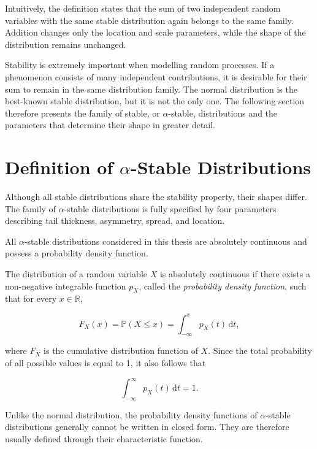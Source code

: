 \documentclass[a4paper, 12pt, openany]{book}
\begin{document}
\begin{tcolorbox}[colback=yellow!5!white, colframe=orange!70!black, title=\textbf{Intuition}, fonttitle=\bfseries]

Intuitively, the definition states that the sum of two independent random variables with the same stable distribution again belongs to the same family. Addition changes only the location and scale parameters, while the shape of the distribution remains unchanged.
\end{tcolorbox}

Stability is extremely important when modelling random processes. If a phenomenon consists of many independent contributions, it is desirable for their sum to remain in the same distribution family. The normal distribution is the best-known stable distribution, but it is not the only one. The following section therefore presents the family of stable, or $\alpha$-stable, distributions and the parameters that determine their shape in greater detail.

\section{Definition of $\alpha$-Stable Distributions}
Although all stable distributions share the stability property, their shapes differ. The family of $\alpha$-stable distributions is fully specified by four parameters describing tail thickness, asymmetry, spread, and location.

All $\alpha$-stable distributions considered in this thesis are absolutely continuous and possess a probability density function.

\begin{tcolorbox}[colback=blue!5!white,colframe=blue!50!black,title=Definition 2: Absolutely continuous distribution]
\label{def:zvezna}
The distribution of a random variable $X$ is absolutely continuous if there exists a non-negative integrable function $p_X$, called the \emph{probability density function}, such that for every $x\in\mathbb{R}$,

\[
F_X(x)=\mathbb{P}(X\leq x)
=\int_{-\infty}^{x}p_X(t)\,\mathrm{d}t,
\]

where $F_X$ is the cumulative distribution function of $X$. Since the total probability of all possible values is equal to 1, it also follows that

\[
\int_{-\infty}^{\infty}p_X(t)\,\mathrm{d}t=1.
\]
\end{tcolorbox}

Unlike the normal distribution, the probability density functions of $\alpha$-stable distributions generally cannot be written in closed form. They are therefore usually defined through their characteristic function.
\end{document}
